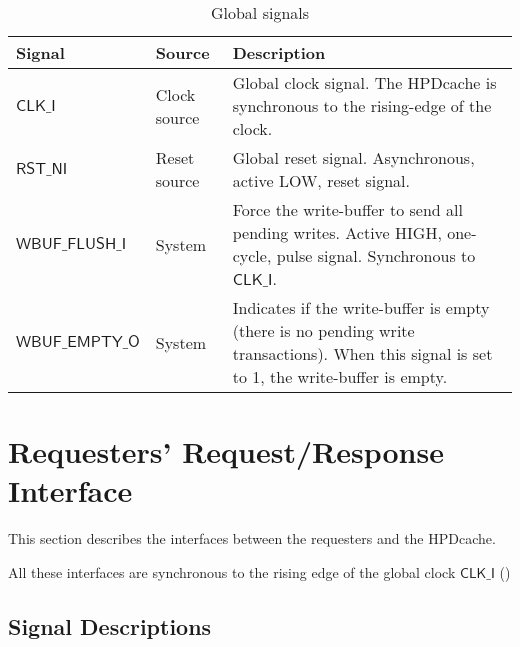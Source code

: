 \documentclass[10pt,titlepage,twoside]{book}
\begin{document}
\begin{table}[h!]
\caption{Global signals}%
{\footnotesize%
\begin{tabular}{p{.21\linewidth}p{.15\linewidth}p{.64\linewidth}}
  \toprule
  \textbf{Signal}
  & \textbf{Source}
  & \textbf{Description} \\
  \midrule
  $\mathsf{CLK\_I}$
  & Clock source
  & Global clock signal.
  The \ac{HPDcache} is synchronous to the rising-edge of the clock.\\
  \midrule
  $\mathsf{RST\_NI}$
  & Reset source
  & Global reset signal.
  Asynchronous, active LOW, reset signal.\\
  \midrule
  $\mathsf{WBUF\_FLUSH\_I}$
  & System
  & Force the write-buffer to send all pending writes.
  Active HIGH, one-cycle, pulse signal.
  Synchronous to $\mathsf{CLK\_I}$.\\
  \midrule
  $\mathsf{WBUF\_EMPTY\_O}$
  & System
  & Indicates if the write-buffer is empty (there is no pending write transactions).
  When this signal is set to 1, the write-buffer is empty.\\
\end{tabular}}
\end{table}

\clearpage

\section{Requesters' Request/Response Interface}

This section describes the interfaces between the requesters and the \ac{HPDcache}.

All these interfaces are synchronous to the rising edge of the global clock $\mathsf{CLK\_I}$ ()


\subsection{Signal Descriptions}
\end{document}
